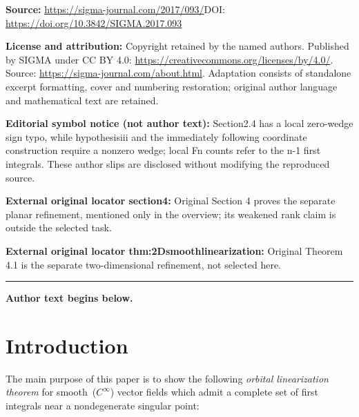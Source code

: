 \documentclass[11pt]{article}
\numberwithin{equation}{section}
\begin{document}
\noindent\textbf{Source:} \url{https://sigma-journal.com/2017/093/}\quad DOI: \url{https://doi.org/10.3842/SIGMA.2017.093}\par
\noindent\textbf{License and attribution:} Copyright retained by the named authors. Published by SIGMA under CC BY 4.0: \url{https://creativecommons.org/licenses/by/4.0/}. Source: \url{https://sigma-journal.com/about.html}. Adaptation consists of standalone excerpt formatting, cover and numbering restoration; original author language and mathematical text are retained.\par
\noindent\textbf{Editorial symbol notice (not author text):} Section2.4 has a local zero-wedge sign typo, while hypothesisiii and the immediately following coordinate construction require a nonzero wedge; local Fn counts refer to the n-1 first integrals. These author slips are disclosed without modifying the reproduced source.\par
\noindent\textbf{External original locator section4:} Original Section 4 proves the separate planar refinement, mentioned only in the overview; its weakened rank claim is outside the selected task.\par
\noindent\textbf{External original locator thm:2Dsmoothlinearization:} Original Theorem 4.1 is the separate two-dimensional refinement, not selected here.\par
\medskip\hrule\medskip\noindent\textbf{Author text begins below.}\par
\setcounter{section}{0}
\setcounter{subsection}{0}
\setcounter{subsubsection}{0}
\setcounter{thm}{0}
\setcounter{equation}{0}
\section{Introduction}

The main purpose of this paper is to show the following \emph{orbital linearization theorem} for smooth~($C^\infty$)
vector f\/ields which admit a complete set of f\/irst integrals near a nondegenerate singular point:
\end{document}
